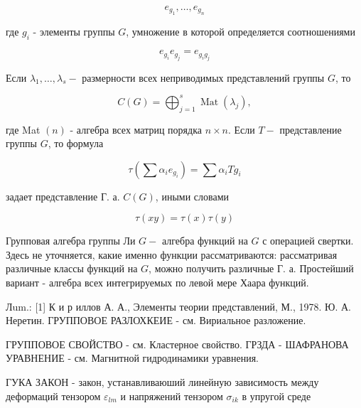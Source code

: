 \documentclass[10pt]{article}
\begin{document}
\[

e_{g_{1}}, \ldots, e_{g_{n}}

\]



где $g_{i}$ - элементы группы $G$, умножение в которой определяется соотношениями



\[

e_{g_{i}} e_{g_{j}}=e_{g_{i} g_{j}}

\]



Если $\lambda_{1}, \ldots, \lambda_{s}-$ размерности всех неприводимых представлений группы $G$, то



\[

C(G)=\bigoplus_{j=1}^{s} \operatorname{Mat}\left(\lambda_{j}\right),

\]



где Mat $(n)$ - алгебра всех матриц порядка $n \times n$. Если $T-$ представление группы $G$, то формула



\[

\tau\left(\sum \alpha_{i} e_{g_{i}}\right)=\sum \alpha_{i} T g_{i}

\]



задает представление Г. а. $C(G)$, иными словами



\[

\tau(x y)=\tau(x) \tau(y)

\]



Групповая алгебра группы Ли $G-$ алгебра функций на $G$ с операцией свертки. Здесь не уточняется, какие именно функции рассматриваются: рассматривая различные классы функций на $G$, можно получить различные Г. а. Простейший вариант - алгебра всех интегрируемых по левой мере Хаара функций.



Лum.: [1] К и р иллов А. А., Элементы теории представлений, М., 1978. Ю. А. Неретин. ГРУППОВОЕ РАЗЛОХКЕИЕ - см. Вириальное разложение.



ГРУППОВОЕ СВОЙСТВО - см. Кластерное свойство. ГРЗДА - ШАФРАНОВА УРАВНЕНИЕ - см. Магнитной гидродинамики уравнения.



ГУКА ЗАКОН - закон, устанавливаюший линейную зависимость между деформаций тензором $\varepsilon_{l m}$ и напряжений тензором $\sigma_{i k}$ в упругой среде
\end{document}
